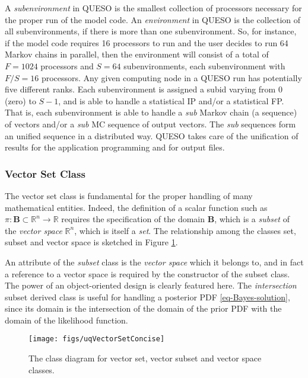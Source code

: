 A {\it subenvironment} in QUESO is the smallest collection of processors necessary for the proper run of the model code.
An {\it environment} in QUESO is the collection of all subenvironments, if there is more than one subenvironment.
So, for instance, if the model code requires 16 processors to run and the user decides to run 64 Markov chains in parallel,
then the environment will consist of a total of $F=1024$ processors and $S=64$ subenvironments, each subenvironment with $F/S=16$ processors.
Any given computing node in a QUESO run has potentially five different ranks.
Each subenvironment is assigned a subid varying from $0$ (zero) to $S-1$, and is able to handle a statistical IP and/or a statistical FP.
That is, each subenvironment is able to handle a {\it sub} Markov chain (a sequence) of vectors and/or a {\it sub} MC sequence of output vectors.
The {\it sub} sequences form an unified sequence in a distributed way.
QUESO takes care of the unification of results for the application programming and for output files.

\subsubsection{Vector Set Class}
%
The vector set class is fundamental for the proper handling of many mathematical entities.
Indeed, the definition of a scalar function such as $\pi:\mathbf{B}\subset\mathbb{R}^n\rightarrow\mathbb{R}$ requires the
specification of the domain $\mathbf{B}$, which is a {\it subset} of the {\it vector space} $\mathbb{R}^n$, which is itself a {\it set}.
The relationship among the classes set, subset and vector space is sketched in Figure \ref{fig-vector-space-subset-classes}.

An attribute of the {\it subset} class is the {\it vector space} which it belongs to, and in fact a reference to a vector space is required by the constructor of the subset class.
The power of an object-oriented design is clearly featured here.
The {\it intersection} subset derived class is useful for handling a posterior PDF \eqref{eq-Bayes-solution},
since its domain is the intersection of the domain of the prior PDF with the domain of the likelihood function.


\begin{figure}[!h]
\centerline{
\texttt{[image: figs/uqVectorSetConcise]}
}
\caption{
The class diagram for vector set, vector subset and vector space classes.
}
\label{fig-vector-space-subset-classes}
\end{figure}

